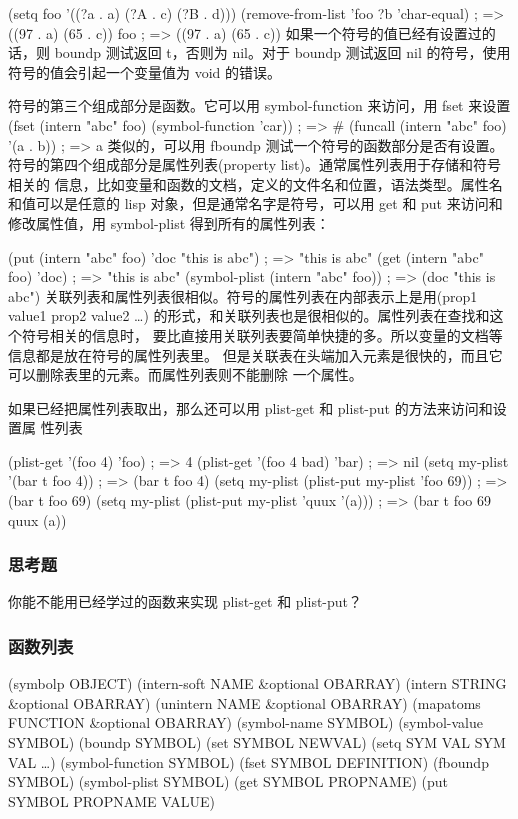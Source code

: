 \documentclass[11pt]{ctexart}
\begin{document}
(setq foo '((?a . a) (?A . c) (?B . d)))
(remove-from-list 'foo ?b 'char-equal)  ; => ((97 . a) (65 . c))
foo                                     ; => ((97 . a) (65 . c))
如果一个符号的值已经有设置过的话，则 boundp 测试返回 t，否则为 nil。对于 boundp
测试返回 nil 的符号，使用符号的值会引起一个变量值为 void 的错误。

符号的第三个组成部分是函数。它可以用 symbol-function 来访问，用 fset 来设置
(fset (intern "abc" foo) (symbol-function 'car)) ; => \#<subr car>
(funcall (intern "abc" foo) '(a . b))            ; => a
类似的，可以用 fboundp 测试一个符号的函数部分是否有设置。
符号的第四个组成部分是属性列表(property list)。通常属性列表用于存储和符号相关的
信息，比如变量和函数的文档，定义的文件名和位置，语法类型。属性名和值可以是任意的
lisp 对象，但是通常名字是符号，可以用 get 和 put 来访问和修改属性值，用
symbol-plist 得到所有的属性列表：

(put (intern "abc" foo) 'doc "this is abc")      ; => "this is abc"
(get (intern "abc" foo) 'doc)                    ; => "this is abc"
(symbol-plist (intern "abc" foo))                ; => (doc "this is abc")
关联列表和属性列表很相似。符号的属性列表在内部表示上是用(prop1 value1 prop2
value2 \ldots{}) 的形式，和关联列表也是很相似的。属性列表在查找和这个符号相关的信息时，
要比直接用关联列表要简单快捷的多。所以变量的文档等信息都是放在符号的属性列表里。
但是关联表在头端加入元素是很快的，而且它可以删除表里的元素。而属性列表则不能删除
一个属性。

如果已经把属性列表取出，那么还可以用 plist-get 和 plist-put 的方法来访问和设置属
性列表

(plist-get '(foo 4) 'foo)               ; => 4
(plist-get '(foo 4 bad) 'bar)           ; => nil
(setq my-plist '(bar t foo 4))          ; => (bar t foo 4)
(setq my-plist (plist-put my-plist 'foo 69)) ; => (bar t foo 69)
(setq my-plist (plist-put my-plist 'quux '(a))) ; => (bar t foo 69 quux (a))
\subsubsection{思考题}
\label{sec:orgfb7ba87}
你能不能用已经学过的函数来实现 plist-get 和 plist-put？
\subsubsection{函数列表}
\label{sec:org74b4eb0}
(symbolp OBJECT)
(intern-soft NAME \&optional OBARRAY)
(intern STRING \&optional OBARRAY)
(unintern NAME \&optional OBARRAY)
(mapatoms FUNCTION \&optional OBARRAY)
(symbol-name SYMBOL)
(symbol-value SYMBOL)
(boundp SYMBOL)
(set SYMBOL NEWVAL)
(setq SYM VAL SYM VAL \ldots{})
(symbol-function SYMBOL)
(fset SYMBOL DEFINITION)
(fboundp SYMBOL)
(symbol-plist SYMBOL)
(get SYMBOL PROPNAME)
(put SYMBOL PROPNAME VALUE)
\end{document}
